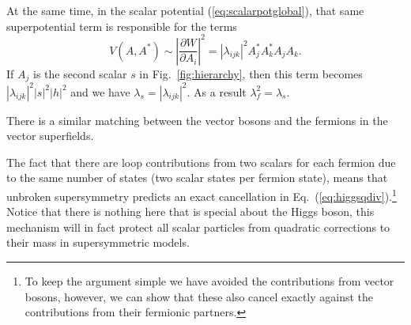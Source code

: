 \documentclass[notes.tex]{subfiles}
\begin{document}
At the same time, in the scalar potential (\ref{eq:scalarpotglobal}), that same superpotential term is responsible for the terms
\begin{equation}
V(A,A^*) \sim \left|\frac{\partial W}{\partial A_i}\right|^2 = |\lambda_{ijk}|^2A^*_jA^*_kA_jA_k.
\end{equation}
If $A_j$ is the second scalar $s$ in Fig.~\ref{fig:hierarchy}, then this term becomes $|\lambda_{ijk}|^2|s|^2|h|^2$ and we have $\lambda_s=|\lambda_{ijk}|^2$. As a result $\lambda_f^2=\lambda_s$.

There is a similar matching between the vector bosons and the fermions in the vector superfields.

The fact that there are loop contributions from two scalars for each fermion due to the same number of states (two scalar states per fermion state), means that unbroken supersymmetry predicts an exact cancellation in Eq.~(\ref{eq:higgsqdiv}).\footnote{To keep the argument simple we have avoided the contributions from vector bosons, however, we can show that these also cancel exactly against the contributions from their fermionic partners.} Notice that there is nothing here that is special about the Higgs boson, this mechanism will in fact protect all scalar particles from quadratic corrections to their mass in supersymmetric models.

\end{document}
